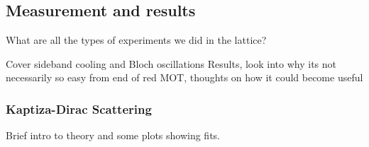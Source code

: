 \subsection{Measurement and results}
\label{ssec:lattice_tests}

What are all the types of experiments we did in the lattice?

Cover sideband cooling and Bloch oscillations
Results, look into why its not necessarily so easy from end of red MOT, thoughts on how it could become useful

\subsubsection{Kaptiza-Dirac Scattering}
\label{sssec:sideband_cooling}

Brief intro to theory and some plots showing fits.


